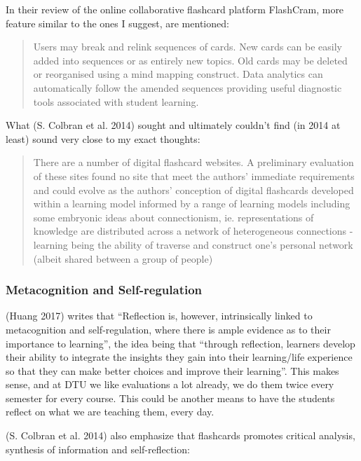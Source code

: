 In their review of the online collaborative flashcard platform
FlashCram, more feature similar to the ones I suggest, are mentioned:

\begin{quote}
Users may break and relink sequences of cards. New cards can be easily
added into sequences or as entirely new topics. Old cards may be deleted
or reorganised using a mind mapping construct. Data analytics can
automatically follow the amended sequences providing useful diagnostic
tools associated with student learning.
\end{quote}

What (S. Colbran et al. 2014) sought and ultimately couldn't find (in
2014 at least) sound very close to my exact thoughts:

\begin{quote}
There are a number of digital flashcard websites. A preliminary
evaluation of these sites found no site that meet the authors' immediate
requirements and could evolve as the authors' conception of digital
flashcards developed within a learning model informed by a range of
learning models including some embryonic ideas about connectionism, ie.
representations of knowledge are distributed across a network of
heterogeneous connections - learning being the ability of traverse and
construct one's personal network (albeit shared between a group of
people)
\end{quote}

\subsubsection{Metacognition and
Self-regulation}\label{metacognition-and-self-regulation}

(Huang 2017) writes that ``Reflection is, however, intrinsically linked
to metacognition and self-regulation, where there is ample evidence as
to their importance to learning'', the idea being that ``through
reflection, learners develop their ability to integrate the insights
they gain into their learning/life experience so that they can make
better choices and improve their learning''. This makes sense, and at
DTU we like evaluations a lot already, we do them twice every semester
for every course. This could be another means to have the students
reflect on what we are teaching them, every day.

(S. Colbran et al. 2014) also emphasize that flashcards promotes
critical analysis, synthesis of information and self-reflection:

